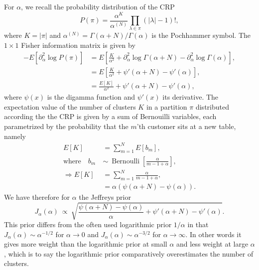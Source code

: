 \documentclass[11pt, oneside]{article}   	%
\begin{document}
For $\alpha$, we recall the probability distribution of the CRP
$$P(\pi) = \frac{\alpha^K}{\alpha^{(N)}}\prod_{\lambda\in\pi}(\vert\lambda\vert - 1)!,$$
where $K = \vert\pi\vert$ and $\alpha^{(N)} = \Gamma(\alpha + N)/\Gamma(\alpha)$ is the Pochhammer symbol.
The $1\times 1$ Fisher information matrix is given by
\begin{equation}\begin{split}
-E[\partial^2_\alpha \log P(\pi)] &= E\left[\frac{K}{\alpha^2} + \partial^2_\alpha \log\Gamma(\alpha + N) - \partial^2_\alpha\log\Gamma(\alpha)\right],\\
&= E\left[\frac{K}{\alpha^2} + \psi'(\alpha + N) - \psi'(\alpha)\right],\\
&= \frac{E[K]}{\alpha^2} + \psi'(\alpha + N) - \psi'(\alpha),
\end{split}\end{equation}
where $\psi(x)$ is the digamma function and $\psi'(x)$ its derivative. The expectation value of the number of clusters $K$ in a partition $\pi$ distributed according the the CRP is given by a sum of Bernouilli variables, each parametrized by the probability that the $m$'th customer sits at a new table, namely
\begin{equation}\begin{split}
E[K] &= \sum_{m = 1}^N E[b_m],\\
\text{where}\quad b_m~&\sim~\operatorname{Bernoulli}\left[\frac{\alpha}{m - 1 + \alpha}\right],\\
\Rightarrow E[K] &=  \sum_{m=1}^N \frac{\alpha}{m - 1 + \alpha},\\
&= \alpha(\psi(\alpha + N) - \psi(\alpha)).
\end{split}\end{equation}
We have therefore for $\alpha$ the Jeffreys prior
\begin{equation}
J_\alpha(\alpha)~\propto~\sqrt{\frac{\psi(\alpha + N) - \psi(\alpha)}{\alpha} + \psi'(\alpha +N) - \psi'(\alpha)}.
\label{eq:jeffalpha}
\end{equation}
This prior differs from the often used logarithmic prior $1/\alpha$ in that $J_{\alpha}(\alpha) \sim \alpha^{-1/2}$ for $\alpha\rightarrow 0$ and $J_{\alpha}(\alpha) \sim\alpha^{-3/2}$ for $\alpha\rightarrow\infty$. In other words it gives more weight than the logarithmic prior at small $\alpha$ and less weight at large $\alpha$, which is to say the logarithmic prior comparatively overestimates the number of clusters.
\end{document}
